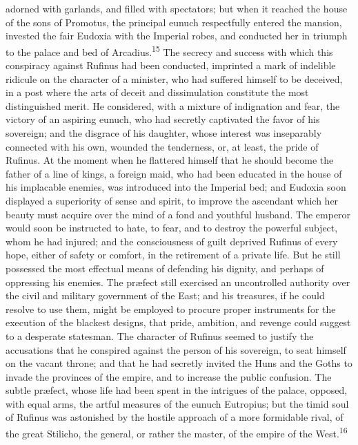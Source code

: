 adorned with garlands, and filled with spectators; but when it
reached the house of the sons of Promotus, the principal eunuch
respectfully entered the mansion, invested the fair Eudoxia with
the Imperial robes, and conducted her in triumph to the palace
and bed of Arcadius.\textsuperscript{15} The secrecy and success with which this
conspiracy against Rufinus had been conducted, imprinted a mark
of indelible ridicule on the character of a minister, who had
suffered himself to be deceived, in a post where the arts of
deceit and dissimulation constitute the most distinguished merit.
He considered, with a mixture of indignation and fear, the
victory of an aspiring eunuch, who had secretly captivated the
favor of his sovereign; and the disgrace of his daughter, whose
interest was inseparably connected with his own, wounded the
tenderness, or, at least, the pride of Rufinus. At the moment
when he flattered himself that he should become the father of a
line of kings, a foreign maid, who had been educated in the house
of his implacable enemies, was introduced into the Imperial bed;
and Eudoxia soon displayed a superiority of sense and spirit, to
improve the ascendant which her beauty must acquire over the mind
of a fond and youthful husband. The emperor would soon be
instructed to hate, to fear, and to destroy the powerful subject,
whom he had injured; and the consciousness of guilt deprived
Rufinus of every hope, either of safety or comfort, in the
retirement of a private life. But he still possessed the most
effectual means of defending his dignity, and perhaps of
oppressing his enemies. The præfect still exercised an
uncontrolled authority over the civil and military government of
the East; and his treasures, if he could resolve to use them,
might be employed to procure proper instruments for the execution
of the blackest designs, that pride, ambition, and revenge could
suggest to a desperate statesman. The character of Rufinus seemed
to justify the accusations that he conspired against the person
of his sovereign, to seat himself on the vacant throne; and that
he had secretly invited the Huns and the Goths to invade the
provinces of the empire, and to increase the public confusion.
The subtle præfect, whose life had been spent in the intrigues
of the palace, opposed, with equal arms, the artful measures of
the eunuch Eutropius; but the timid soul of Rufinus was
astonished by the hostile approach of a more formidable rival, of
the great Stilicho, the general, or rather the master, of the
empire of the West.\textsuperscript{16}

